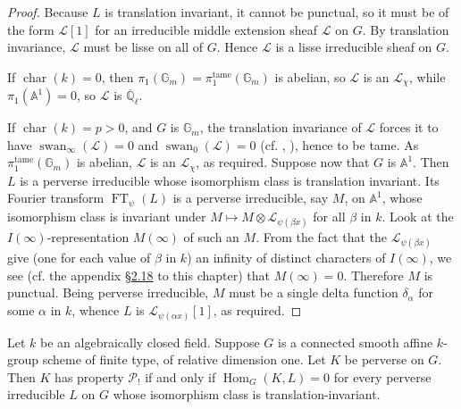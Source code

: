 \begin{proof}
Because \(L\) is translation invariant, it cannot be punctual, so it must be of
the form \(\mathcal{L}[1]\) for an irreducible middle extension sheaf
\(\mathcal{L}\) on \(G\). By translation invariance, \(\mathcal{L}\) must be
lisse on all of \(G\). Hence \(\mathcal{L}\) is a lisse irreducible sheaf on
\(G\).

If \(\operatorname{char}(k)=0\), then
\(\pi_1(\mathbb{G}_m)=\pi_1^{\mathrm{tame}}(\mathbb{G}_m)\) is abelian, so
\(\mathcal{L}\) is an \(\mathcal{L}_\chi\), while
\(\pi_1(\mathbb{A}^1)=0\), so \(\mathcal{L}\) is
\(\overline{\mathbb{Q}}_\ell\).

If \(\operatorname{char}(k)=p>0\), and \(G\) is \(\mathbb{G}_m\), the
translation invariance of \(\mathcal{L}\) forces it to have
\(\operatorname{swan}_\infty(\mathcal{L})=0\) and
\(\operatorname{swan}_0(\mathcal{L})=0\) (cf. \cite[1.1]{Ver},
\cite[4.1.6]{Ka-GKM}), hence to be tame. As
\(\pi_1^{\mathrm{tame}}(\mathbb{G}_m)\) is abelian, \(\mathcal{L}\) is an
\(\mathcal{L}_\chi\), as required. Suppose now that \(G\) is
\(\mathbb{A}^1\). Then \(L\) is a perverse irreducible whose isomorphism class
is translation invariant. Its Fourier transform \(\operatorname{FT}_\psi(L)\)
is a perverse irreducible, say \(M\), on \(\mathbb{A}^1\), whose isomorphism
class is invariant under
\(M\mapsto M\otimes\mathcal{L}_{\psi(\beta x)}\) for all \(\beta\) in \(k\).
Look at the \(I(\infty)\)-representation \(M(\infty)\) of such an \(M\). From
the fact that the \(\mathcal{L}_{\psi(\beta x)}\) give (one for each value of
\(\beta\) in \(k\)) an infinity of distinct characters of \(I(\infty)\), we see
(cf. the appendix \hyperref[sec:2.18]{\S2.18} to this chapter) that \(M(\infty)=0\). Therefore \(M\)
is punctual. Being perverse irreducible, \(M\) must be a single delta function
\(\delta_\alpha\) for some \(\alpha\) in \(k\), whence \(L\) is
\(\mathcal{L}_{\psi(\alpha x)}[1]\), as required.
\end{proof}

Let \(k\) be an algebraically closed field. Suppose \(G\) is a connected smooth
affine \(k\)-group scheme of finite type, of relative dimension one. Let \(K\)
be perverse on \(G\). Then \(K\) has property \(\mathcal{P}_!\) if and only if
\(\operatorname{Hom}_G(K,L)=0\) for every perverse irreducible \(L\) on \(G\)
whose isomorphism class is translation-invariant.

